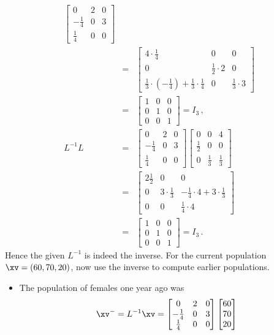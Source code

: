 \begin{example}
\begin{solution}
\begin{eqnarray*}
\begin{bmatrix} 0&2&0\\-\frac14&0&3\\\frac14&0&0 \end{bmatrix}
\\&=&
\begin{bmatrix} 4\cdot\frac14&0&0\\
0&\frac12\cdot2&0\\
\frac13\cdot(-\frac14)+\frac13\cdot\frac14&0&\frac13\cdot3 \end{bmatrix}
\\&=&\begin{bmatrix} 1&0&0\\0&1&0\\0&0&1 \end{bmatrix}=I_3\,,
\\L^{-1}L&=&\begin{bmatrix} 0&2&0\\-\frac14&0&3\\\frac14&0&0 \end{bmatrix}
\begin{bmatrix} 0&0&4\\\frac12&0&0\\0&\frac13&\frac13 \end{bmatrix}
\\&=&\begin{bmatrix} 2\frac12&0&0\\
0&3\cdot\frac13&-\frac14\cdot4+3\cdot\frac13\\
0&0&\frac14\cdot4 \end{bmatrix}
\\&=&\begin{bmatrix} 1&0&0\\0&1&0\\0&0&1 \end{bmatrix}=I_3\,.
\end{eqnarray*}
Hence the given \(L^{-1}\) is indeed the inverse.
For the current population \(\xv=(60,70,20)\), now use the inverse to compute earlier populations.
\begin{itemize}
\item The population of females one year ago was
\begin{equation*}
\xv^-=L^{-1}\xv
=\begin{bmatrix} 0&2&0\\-\frac14&0&3\\\frac14&0&0 \end{bmatrix}
\begin{bmatrix} 60\\70\\20 \end{bmatrix}

\end{equation*}
\end{itemize}
\end{solution}
\end{example}
